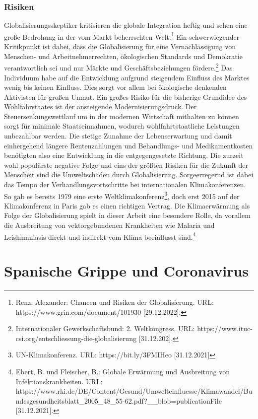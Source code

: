 \documentclass[12pt]{article}
\begin{document}
\subsubsection{Risiken}
Globalisierungsskeptiker kritisieren die globale Integration heftig und sehen eine große Bedrohung in der vom Markt beherrschten Welt.\footnote{Renz, Alexander: Chancen und Risiken der Globalisierung. URL: https://www.grin.com/document/101930 [29.12.2022].} Ein schwerwiegender Kritikpunkt ist dabei, dass die Globalisierung für eine Vernachlässigung von Menschen- und Arbeitnehmerrechten, ökologischen Standards und Demokratie verantwortlich sei und nur Märkte und Geschäftsbeziehungen fördere.\footnote{Internationaler Gewerkschaftsbund: 2. Weltkongress. URL: https://www.ituc-csi.org/entschliessung-die-globalisierung [31.12.202].} Das Individuum habe auf die Entwicklung aufgrund steigendem Einfluss des Marktes wenig bis keinen Einfluss. Dies sorgt vor allem bei ökologische denkenden Aktivisten für großen Unmut.
Ein großes Risiko für die bisherige Grundidee des Wohlfahrstaates ist der ansteigende Modernisierungsdruck. Der Steuersenkungswettlauf um in der modernen Wirtschaft mithalten zu können sorgt für minimale Staatseinnahmen, wodurch wohlfahrtstaatliche Leistungen unbezahlbar werden. Die stetige Zunahme der Lebenserwartung und damit einhergehend längere Rentenzahlungen und Behandlungs- und Medikamentkosten benötigten also eine Entwicklung in die entgegengesetzte Richtung.
Die zurzeit wohl populärste negative Folge und eins der größten Risiken für die Zukunft der Menscheit sind die Umweltschäden durch Globalisierung. Sorgeerregernd ist dabei das Tempo der Verhandlungsvortschritte bei internationalen Klimakonferenzen. So gab es bereits 1979 eine erste Weltklimakonferenz\footnote{UN-Klimakonferenz. URL: https://bit.ly/3FMIHeo [31.12.2021]}, doch erst 2015 auf der Klimakonferenz in Paris gab es einen richtigen Vertrag. Die Klimaerwärmung als Folge der Globalisierung spielt in dieser Arbeit eine besondere Rolle, da vorallem die Ausbreitung von vektorgebundenen Krankheiten wie Malaria und Leishmaniasis direkt und indirekt vom Klima beeinflusst sind.\footnote{Ebert, B. und Fleischer, B.: Globale Erwärmung und Ausbreitung von Infektionskrankheiten. URL: https://www.rki.de/DE/Content/Gesund/Umwelteinfluesse/Klimawandel/Bundesgesundheitsblatt_2005_48_55-62.pdf?__blob=publicationFile [31.12.2021].}
\section{Spanische Grippe und Coronavirus}
\end{document}
